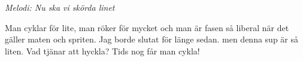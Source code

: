 {\footnotesize\textit{Melodi: Nu ska vi skörda linet}}\par
\vspace{10pt}
Man cyklar för lite, man röker för mycket
och man är fasen så liberal
när det gäller maten och spriten.
Jag borde slutat för länge sedan.
men denna sup är så liten.
Vad tjänar att hyckla?
Tids nog får man cykla!
